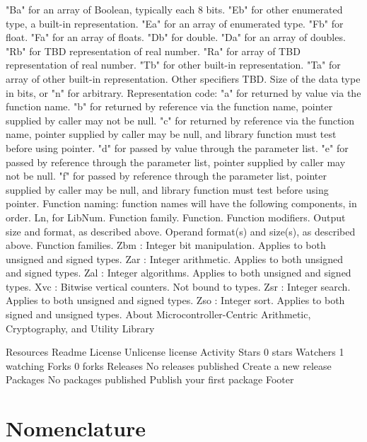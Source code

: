 "Ba" for an array of Boolean, typically each 8 bits.
"Eb" for other enumerated type, a built-in representation.
"Ea" for an array of enumerated type.
"Fb" for float.
"Fa" for an array of floats.
"Db" for double.
"Da" for an array of doubles.
"Rb" for TBD representation of real number.
"Ra" for array of TBD representation of real number.
"Tb" for other built-in representation.
"Ta" for array of other built-in representation.
Other specifiers TBD.
Size of the data type in bits, or "n" for arbitrary.
Representation code:
"a" for returned by value via the function name.
"b" for returned by reference via the function name, pointer supplied by caller may not be null.
"c" for returned by reference via the function name, pointer supplied by caller may be null, and library function must test before using pointer.
"d" for passed by value through the parameter list.
"e" for passed by reference through the parameter list, pointer supplied by caller may not be null.
"f" for passed by reference through the parameter list, pointer supplied by caller may be null, and library function must test before using pointer.
Function naming: function names will have the following components, in order.
Ln, for LibNum.
Function family.
Function.
Function modifiers.
Output size and format, as described above.
Operand format(s) and size(s), as described above.
Function families.
Zbm : Integer bit manipulation.
Applies to both unsigned and signed types.
Zar : Integer arithmetic.
Applies to both unsigned and signed types.
Zal : Integer algorithms.
Applies to both unsigned and signed types.
Xvc : Bitwise vertical counters.
Not bound to types.
Zsr : Integer search.
Applies to both unsigned and signed types.
Zso : Integer sort.
Applies to both signed and unsigned types.
About
Microcontroller-Centric Arithmetic, Cryptography, and Utility Library

Resources
 Readme
License
 Unlicense license
 Activity
Stars
 0 stars
Watchers
 1 watching
Forks
 0 forks
Releases
No releases published
Create a new release
Packages
No packages published
Publish your first package
Footer


\section{Nomenclature}
\label{cldd0:snom0}

